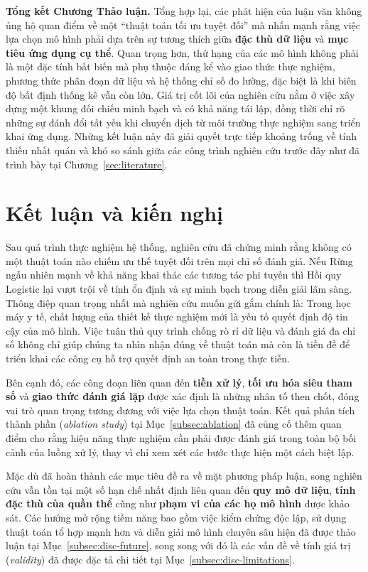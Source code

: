 \documentclass[14pt,a4paper]{extreport}
\begin{document}
\noindent\textbf{Tổng kết Chương Thảo luận.} Tổng hợp lại, các phát hiện của luận văn không ủng hộ quan điểm về một ``thuật toán tối ưu tuyệt đối'' mà nhấn mạnh rằng việc lựa chọn mô hình phải dựa trên sự tương thích giữa \textbf{đặc thù dữ liệu} và \textbf{mục tiêu ứng dụng cụ thể}. Quan trọng hơn, thứ hạng của các mô hình không phải là một đặc tính bất biến mà phụ thuộc đáng kể vào giao thức thực nghiệm, phương thức phân đoạn dữ liệu và hệ thống chỉ số đo lường, đặc biệt là khi biên độ bất định thống kê vẫn còn lớn. Giá trị cốt lõi của nghiên cứu nằm ở việc xây dựng một khung đối chiếu minh bạch và có khả năng tái lập, đồng thời chỉ rõ những sự đánh đổi tất yếu khi chuyển dịch từ môi trường thực nghiệm sang triển khai ứng dụng. Những kết luận này đã giải quyết trực tiếp khoảng trống về tính thiếu nhất quán và khó so sánh giữa các công trình nghiên cứu trước đây như đã trình bày tại Chương~\ref{sec:literature}.

\chapter{Kết luận và kiến nghị}
\label{sec:conclusion}

Sau quá trình thực nghiệm hệ thống, nghiên cứu đã chứng minh rằng không có một thuật toán nào chiếm ưu thế tuyệt đối trên mọi chỉ số đánh giá. Nếu Rừng ngẫu nhiên mạnh về khả năng khai thác các tương tác phi tuyến thì Hồi quy Logistic lại vượt trội về tính ổn định và sự minh bạch trong diễn giải lâm sàng. Thông điệp quan trọng nhất mà nghiên cứu muốn gửi gắm chính là: Trong học máy y tế, chất lượng của thiết kế thực nghiệm mới là yếu tố quyết định độ tin cậy của mô hình. Việc tuân thủ quy trình chống rò rỉ dữ liệu và đánh giá đa chỉ số không chỉ giúp chúng ta nhìn nhận đúng về thuật toán mà còn là tiền đề để triển khai các công cụ hỗ trợ quyết định an toàn trong thực tiễn.

Bên cạnh đó, các công đoạn liên quan đến \textbf{tiền xử lý}, \textbf{tối ưu hóa siêu tham số} và \textbf{giao thức đánh giá lặp} được xác định là những nhân tố then chốt, đóng vai trò quan trọng tương đương với việc lựa chọn thuật toán. Kết quả phân tích thành phần (\textit{ablation study}) tại Mục~\ref{subsec:ablation} đã củng cố thêm quan điểm cho rằng hiệu năng thực nghiệm cần phải được đánh giá trong toàn bộ bối cảnh của luồng xử lý, thay vì chỉ xem xét các bước thực hiện một cách biệt lập.

Mặc dù đã hoàn thành các mục tiêu đề ra về mặt phương pháp luận, song nghiên cứu vẫn tồn tại một số hạn chế nhất định liên quan đến \textbf{quy mô dữ liệu}, \textbf{tính đặc thù của quần thể} cũng như \textbf{phạm vi của các họ mô hình} được khảo sát. Các hướng mở rộng tiềm năng bao gồm việc kiểm chứng độc lập, sử dụng thuật toán tổ hợp mạnh hơn và diễn giải mô hình chuyên sâu hiện đã được thảo luận tại Mục~\ref{subsec:disc-future}, song song với đó là các vấn đề về tính giá trị (\textit{validity}) đã được đặc tả chi tiết tại Mục~\ref{subsec:disc-limitations}.
\end{document}
